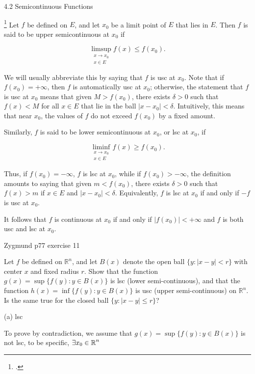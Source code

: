 \documentclass[UTF8,a4paper,10pt]{article}
\begin{document}
\begin{mybox}{4.2 Semicontinuous Functions}

 \footcite[][69]{Wheeden_Zygmund_2015}
Let $f$ be defined on $E$, and let $x_0$ be a limit point of $E$ that lies in $E$. Then $f$ is said to be upper semicontinuous at $x_0$ if


\[
\limsup_{\substack{x\to x_0 \\ x\in E}} f(x) \leq f(x_0).
\]

We will usually abbreviate this by saying that $f$ is usc at $x_0$. Note that if $f(x_0) = +\infty$, then $f$ is automatically usc at $x_0$; otherwise, the statement that $f$ is usc at $x_0$ means that given $M > f(x_0)$, there exists $\delta > 0$ such that $f(x) < M$ for all $x \in E$ that lie in the ball $|x - x_0| < \delta$. Intuitively, this means that near $x_0$, the values of $f$ do not exceed $f(x_0)$ by a fixed amount.

Similarly, $f$ is said to be lower semicontinuous at $x_0$, or lsc at $x_0$, if

\[
\liminf_{\substack{x\to x_0 \\ x\in E}} f(x) \geq f(x_0).
\]


Thus, if $f(x_0) = -\infty$, $f$ is lsc at $x_0$, while if $f(x_0) > -\infty$, the definition amounts to saying that given $m < f(x_0)$, there exists $\delta > 0$ such that $f(x) > m$ if $x \in E$ and $|x - x_0| < \delta$. Equivalently, $f$ is lsc at $x_0$ if and only if $-f$ is usc at $x_0$.

It follows that $f$ is continuous at $x_0$ if and only if $|f(x_0)| < +\infty$ and $f$ is both usc and lsc at $x_0$.

\end{mybox}


\begin{Problem}[]{Zygmund p77 exercise 11}

  Let $f$ be defined on $\mathbb{R}^n$, and let $B(x)$ denote the open ball $\{y : |x - y| < r\}$ with center $x$ and fixed radius $r$. Show that the function $g(x) = \sup\{f(y) : y \in B(x)\}$ is lsc (lower semi-continuous), and that the function $h(x) = \inf\{f(y) : y \in B(x)\}$ is usc (upper semi-continuous) on $\mathbb{R}^n$. Is the same true for the closed ball $\{y : |x - y| \leq r\}$?


\end{Problem}

(a) 
lsc


To prove by contradiction, we assume that \(g(x) = \sup\{f(y) : y \in B(x)\}\) is not lsc, to be specific,  \(\exists x_0\in \operatorname{\mathbb{R}}^n\)
 
\end{document}
